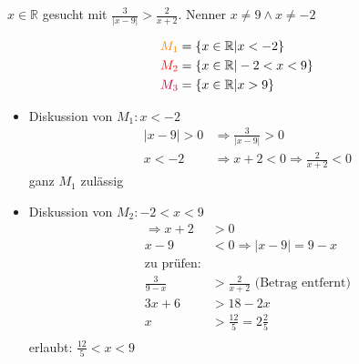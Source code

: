 \begin{example}
$x\in \mathbb{R}$ gesucht mit $\frac{3}{|x-9|} > \frac{2}{x+2}$. Nenner $x\neq9 \land x\neq -2$

\begin{center}

\end{center}
\vspace{-.8cm}
\begin{align*}
\color{orange}M_1\color{black} &= \{x \in \mathbb{R} | x < -2\} \\
\color{red}M_2\color{black} &= \{x \in \mathbb{R} | -2 < x < 9\} \\
\color{purple}M_3\color{black} &= \{x \in \mathbb{R} | x > 9\}
\end{align*}

\begin{itemize}
 \item Diskussion von $M_1: x < -2$
\begin{align*}
|x-9|>0 &\Rightarrow \frac{3}{|x-9|} > 0 \\
x<-2 &\Rightarrow x+2<0 \Rightarrow \frac{2}{x+2}<0
\end{align*}
ganz $M_1$ zulässig
 \item Diskussion von $M_2: -2<x<9$
\begin{align*}
\Rightarrow x+2 &> 0 \\
x-9&<0 \Rightarrow |x-9|=9-x \\
\textrm{zu prüfen:} \\
\frac{3}{9-x} &> \frac{2}{x+2} \textrm{ (Betrag entfernt)} \\
3x+6 &> 18-2x \\
x &> \frac{12}{5} = 2 \frac{2}{5} \\
\end{align*}
erlaubt: $\frac{12}{5}<x<9$


\end{itemize}
\end{example}
